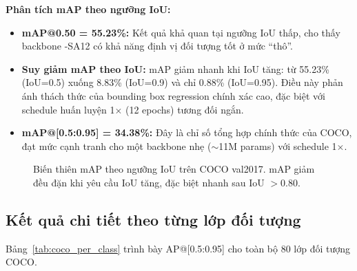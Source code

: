 \textbf{Phân tích mAP theo ngưỡng IoU:}
\begin{itemize}
    \item \textbf{mAP@0.50 = 55.23\%:} Kết quả khả quan tại ngưỡng IoU thấp, cho thấy backbone \fastvit{}-SA12 có khả năng định vị đối tượng tốt ở mức ``thô''.
    
    \item \textbf{Suy giảm mAP theo IoU:} mAP giảm nhanh khi IoU tăng: từ 55.23\% (IoU=0.5) xuống 8.83\% (IoU=0.9) và chỉ 0.88\% (IoU=0.95). Điều này phản ánh thách thức của bounding box regression chính xác cao, đặc biệt với schedule huấn luyện 1$\times$ (12 epochs) tương đối ngắn.
    
    \item \textbf{mAP@[0.5:0.95] = 34.38\%:} Đây là chỉ số tổng hợp chính thức của COCO, đạt mức cạnh tranh cho một backbone nhẹ ($\sim$11M params) với schedule 1$\times$.
\end{itemize}

\begin{figure}[H]
\centering
{}
\caption{Biến thiên mAP theo ngưỡng IoU trên COCO val2017. mAP giảm đều đặn khi yêu cầu IoU tăng, đặc biệt nhanh sau IoU $> 0.80$.}
\label{fig:map_vs_iou}
\end{figure}

\subsection{Kết quả chi tiết theo từng lớp đối tượng}

Bảng~\ref{tab:coco_per_class} trình bày AP@[0.5:0.95] cho toàn bộ 80 lớp đối tượng COCO.

